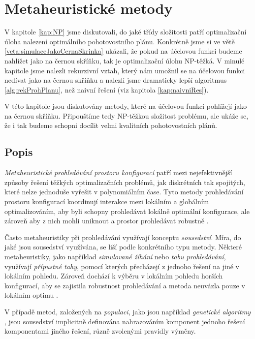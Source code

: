 \section{Metaheuristické metody}\label{kap:heuristiky}

V kapitole \ref{kap:NP} jsme diskutovali, do jaké třídy složitosti patří optimalizační úloha nalezení optimálního pohotovostního plánu.
Konkrétně jsme si ve větě \ref{veta:simulaceJakoCernaSkrinka} ukázali, že pokud na účelovou funkci budeme nahlížet jako na černou skříňku,
tak je optimalizační úlohu NP-těžká. V minulé kapitole jsme nalezli rekurzivní vztah, který nám umožnil se na
účelovou funkci nedívat jako na černou skříňku a nalezli jsme dramaticky lepší algoritmus \ref{alg:rekProhPlanu}, než naivní řešení (viz kapitola \ref{kap:naivniRes}).

V této kapitole jsou diskutovány metody, které na účelovou funkci pohlížejí jako na černou skříňku. 
Připouštíme tedy NP-těžkou složitost problému, ale ukáže se, že i tak budeme schopni docílit velmi kvalitních pohotovostních plánů.

\subsection{Popis}

\textit{Metaheuristické prohledávání prostoru konfigurací} patří mezi nejefektivnější způsoby řešení těžkých optimalizačních problémů,
jak diskrétních tak spojitých,
které nelze jednoduše vyřešit v polynomiálním čase.
Tyto metody prohledávání prostoru konfigurací koordinují interakce mezi lokálním a globálním optimalizováním,
aby byli schopny prohledávat lokálně optimální konfigurace, ale zároveň aby z nich mohli uniknout a prostor prohledávat robustně \cite{GlovKoch03}.

Často metaheuristiky při prohledávání využívají konceptu \textit{sousedství}.
Míra, do jaké jsou sousedství využívána, se liší podle konkrétního typu metody.
Některé metaheuristiky, jako například \textit{simulované žíhání} nebo \textit{tabu prohledávání}, využívají \textit{přípustné tahy},
pomocí kterých přecházejí z jednoho řešení na jiné v lokálním pohledu.
Zároveň dochází k výběru v lokálním pohledu horších konfigurací, aby se zajistila robustnost prohledávání
a metoda neuvázla pouze v lokálním optimu \cite{GlovKoch03}.

V případě metod, založených na \textit{populaci}, jako jsou například \textit{genetické algoritmy} \cite{genetic}, jsou sousedství implicitně definována
nahrazováním komponent jednoho řešení komponentami jiného řešení, různě zvolenými pravidly výměny.

